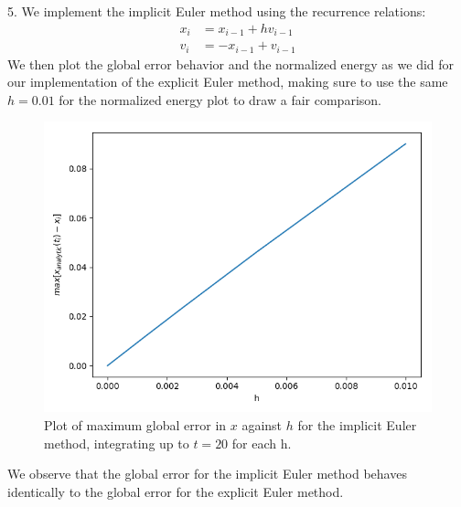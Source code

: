 \documentclass[11pt]{article}
\begin{document}
5. We implement the implicit Euler method using the recurrence relations:
\begin{align*}
x_i &= x_{i-1}+hv_{i-1} \\
v_i &= -x_{i-1}+v_{i-1}
\end{align*}
We then plot the global error behavior and the normalized energy as we did for our implementation of the explicit Euler method, making sure to use the same $h=0.01$ for the normalized energy plot to draw a fair comparison.
\newpage
\begin{figure}[htp]
\centering
\includegraphics[scale=0.70]{implicit_err_behavior_0-01_4_20.png}
\caption{Plot of maximum global error in $x$ against $h$ for the implicit Euler method, integrating up to $t=20$ for each h.}
\label{impliciterr}
\end{figure}
We observe that the global error for the implicit Euler method behaves identically to the global error for the explicit Euler method.
\newpage
\end{document}
